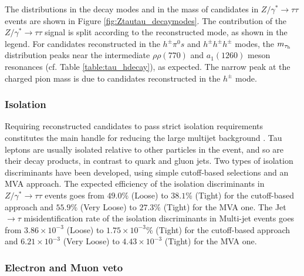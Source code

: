 The distributions in the decay modes and in the mass of \hadtau candidates in \ensuremath{Z/\gamma^{*} \longrightarrow \tau\tau} events are shown in Figure \ref{fig:Ztautau_decaymodes}. The contribution of the \ensuremath{Z/\gamma^{*} \longrightarrow \tau\tau} signal is split according to the reconstructed \hadtau mode, as shown in the legend. For \hadtau candidates reconstructed in the \ensuremath{h^{\pm}\pi^{0}s} and \ensuremath{h^{\pm}h^{\pm}h^{\pm}} modes, the \ensuremath{m_{\hadtau}} distribution peaks near the intermediate \ensuremath{ρ\rho(770)} and \ensuremath{a_{1}(1260)} meson resonances (cf. Table \ref{table:tau_hdecay}), as expected. The narrow peak at the charged pion mass is due to \hadtau candidates reconstructed in the \ensuremath{h^{\pm}} mode.

\subsubsection{Isolation}

Requiring reconstructed \hadtau candidates to pass strict isolation requirements constitutes the main handle for reducing the large multijet background \cite{Khachatryan:2015dfa}. Tau leptons are usually isolated relative to other particles in the event, and so are their decay products, in contrast to quark and gluon jets. Two types of \hadtau isolation discriminants have been developed, using simple cutoff-based selections and an MVA approach. The expected efficiency of the \hadtau isolation discriminants in \ensuremath{Z/\gamma^{*} \longrightarrow \tau\tau} events goes from \ensuremath{49.0\%} (Loose) to \ensuremath{38.1}\% (Tight) for the cutoff-based approach and \ensuremath{55.9\%} (Very Loose) to \ensuremath{27.3\%} (Tight) for the MVA one. The Jet \ensuremath{\to \tau} misidentification rate of the \hadtau isolation discriminants in Multi-jet events goes from \ensuremath{3.86 \times 10^{−3}} (Loose) to \ensuremath{1.75 \times 10^{−3}}\% (Tight) for the cutoff-based approach and \ensuremath{6.21 \times 10^{−3}} (Very Loose) to \ensuremath{4.43 \times 10^{−3}} (Tight) for the MVA one.
 
\subsubsection{Electron and Muon veto}


